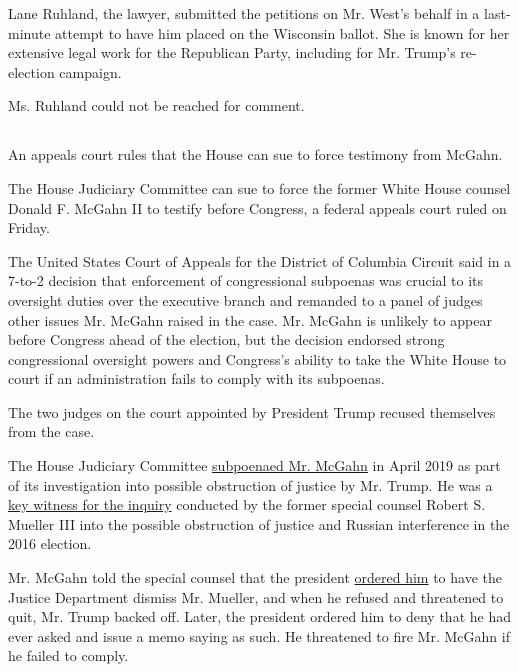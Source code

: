 Lane Ruhland, the lawyer, submitted the petitions on Mr. West's behalf
in a last-minute attempt to have him placed on the Wisconsin ballot. She
is known for her extensive legal work for the Republican Party,
including for Mr. Trump's re-election campaign.

Ms. Ruhland could not be reached for comment.

\hypertarget{section-6}{%
\subsection{}\label{section-6}}

An appeals court rules that the House can sue to force testimony from
McGahn.

The House Judiciary Committee can sue to force the former White House
counsel Donald F. McGahn II to testify before Congress, a federal
appeals court ruled on Friday.

The United States Court of Appeals for the District of Columbia Circuit
said in a 7-to-2 decision that enforcement of congressional subpoenas
was crucial to its oversight duties over the executive branch and
remanded to a panel of judges other issues Mr. McGahn raised in the
case. Mr. McGahn is unlikely to appear before Congress ahead of the
election, but the decision endorsed strong congressional oversight
powers and Congress's ability to take the White House to court if an
administration fails to comply with its subpoenas.

The two judges on the court appointed by President Trump recused
themselves from the case.

The House Judiciary Committee
\href{https://www.nytimes3xbfgragh.onion/2019/04/22/us/politics/mcgahn-trump-attacks.html}{subpoenaed
Mr. McGahn} in April 2019 as part of its investigation into possible
obstruction of justice by Mr. Trump. He was a
\href{https://www.nytimes3xbfgragh.onion/interactive/2019/04/19/us/politics/mueller-report-citations.html}{key
witness for the inquiry} conducted by the former special counsel Robert
S. Mueller III into the possible obstruction of justice and Russian
interference in the 2016 election.

Mr. McGahn told the special counsel that the president
\href{https://www.nytimes3xbfgragh.onion/2018/01/25/us/politics/trump-mueller-special-counsel-russia.html}{ordered
him} to have the Justice Department dismiss Mr. Mueller, and when he
refused and threatened to quit, Mr. Trump backed off. Later, the
president ordered him to deny that he had ever asked and issue a memo
saying as such. He threatened to fire Mr. McGahn if he failed to comply.


